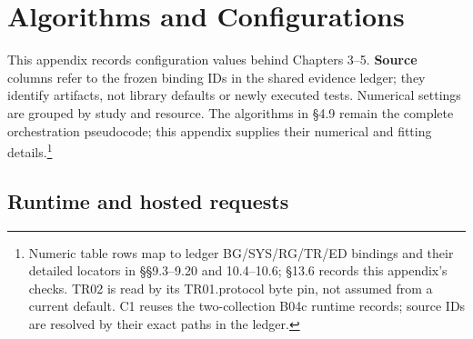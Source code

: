 \chapter{Algorithms and Configurations}\label{s:897581bf5b356d0e}

This appendix records configuration values behind Chapters 3--5. \textbf{Source}
columns refer to the frozen binding IDs in the shared evidence ledger;
they identify artifacts, not library defaults or newly executed tests.
Numerical settings are grouped by study and resource. The algorithms in
§4.9 remain the complete orchestration pseudocode; this appendix supplies
their numerical and fitting details.\footnote{Numeric table rows map to ledger BG/SYS/RG/TR/ED bindings and their detailed locators in §§9.3--9.20 and 10.4--10.6; §13.6 records this appendix's checks. TR02 is read by its TR01.protocol byte pin, not assumed from a current default. C1 reuses the two-collection B04c runtime records; source IDs are resolved by their exact paths in the ledger.}

\section{Runtime and hosted requests}\label{s:29238e199c21a678}

\begingroup
\small
{}
\setlength{\tabcolsep}{3pt}

